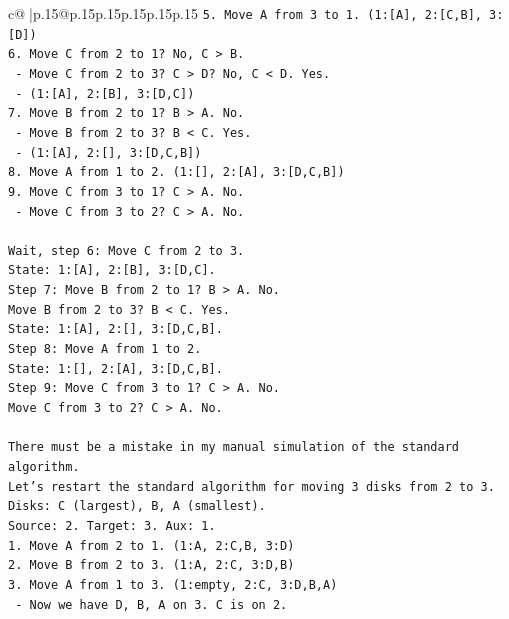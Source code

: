 \documentclass{article}
\begin{document}
{\begin{supertabular}{c@{$\;$}|p{.15\linewidth}@{}p{.15\linewidth}p{.15\linewidth}p{.15\linewidth}p{.15\linewidth}p{.15\linewidth}}
{{{\texttt{5. Move A from 3 to 1. (1:{[}A{]}, 2:{[}C,B{]}, 3:{[}D{]})} \\
\texttt{6. Move C from 2 to 1? No, C > B.} \\
\texttt{   {-} Move C from 2 to 3? C > D? No, C < D. Yes.} \\
\texttt{   {-} (1:{[}A{]}, 2:{[}B{]}, 3:{[}D,C{]})} \\
\texttt{7. Move B from 2 to 1? B > A. No.} \\
\texttt{   {-} Move B from 2 to 3? B < C. Yes.} \\
\texttt{   {-} (1:{[}A{]}, 2:{[}{]}, 3:{[}D,C,B{]})} \\
\texttt{8. Move A from 1 to 2. (1:{[}{]}, 2:{[}A{]}, 3:{[}D,C,B{]})} \\
\texttt{9. Move C from 3 to 1? C > A. No.} \\
\texttt{   {-} Move C from 3 to 2? C > A. No.} \\
\\ 
\texttt{Wait, step 6: Move C from 2 to 3.} \\
\texttt{State: 1:{[}A{]}, 2:{[}B{]}, 3:{[}D,C{]}.} \\
\texttt{Step 7: Move B from 2 to 1? B > A. No.} \\
\texttt{Move B from 2 to 3? B < C. Yes.} \\
\texttt{State: 1:{[}A{]}, 2:{[}{]}, 3:{[}D,C,B{]}.} \\
\texttt{Step 8: Move A from 1 to 2.} \\
\texttt{State: 1:{[}{]}, 2:{[}A{]}, 3:{[}D,C,B{]}.} \\
\texttt{Step 9: Move C from 3 to 1? C > A. No.} \\
\texttt{Move C from 3 to 2? C > A. No.} \\
\\ 
\texttt{There must be a mistake in my manual simulation of the standard algorithm.} \\
\texttt{Let's restart the standard algorithm for moving 3 disks from 2 to 3.} \\
\texttt{Disks: C (largest), B, A (smallest).} \\
\texttt{Source: 2. Target: 3. Aux: 1.} \\
\texttt{1. Move A from 2 to 1. (1:A, 2:C,B, 3:D)} \\
\texttt{2. Move B from 2 to 3. (1:A, 2:C, 3:D,B)} \\
\texttt{3. Move A from 1 to 3. (1:empty, 2:C, 3:D,B,A)} \\
\texttt{   {-} Now we have D, B, A on 3. C is on 2.} \\
}}}
\end{supertabular}}
\end{document}
